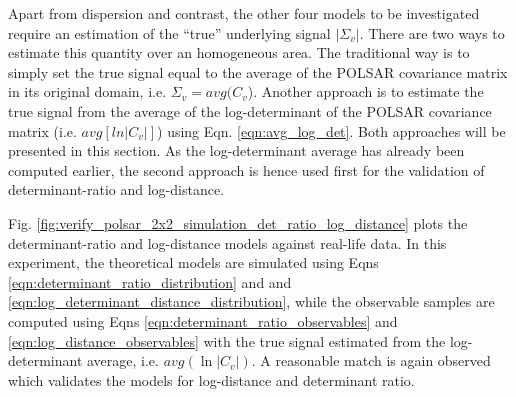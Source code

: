 \documentclass[journal]{IEEEtran}
\begin{document}
Apart from dispersion and contrast,
the other four models to be investigated require an estimation of the ``true'' underlying signal $|\Sigma_v|$. 
There are two ways to estimate this quantity over an homogeneous area.
The traditional way is to simply set the true signal equal to the average of the POLSAR covariance matrix in its original domain, i.e. $\Sigma_v = avg(C_v$).
Another approach is to estimate the true signal from the average of the log-determinant of the POLSAR covariance matrix (i.e. $avg[ln|C_v|]$) using Eqn. \ref{eqn:avg_log_det}.
Both approaches will be presented in this section.
As the log-determinant average has already been computed earlier, 
  the second approach is hence used first for the validation of determinant-ratio and log-distance.

Fig. \ref{fig:verify_polsar_2x2_simulation_det_ratio_log_distance} plots the determinant-ratio and log-distance models against real-life data.
In this experiment, the theoretical models are simulated using Eqns \ref{eqn:determinant_ratio_distribution} and
and \ref{eqn:log_determinant_distance_distribution},
  while the observable samples are computed using Eqns \ref{eqn:determinant_ratio_observables} and \ref{eqn:log_distance_observables}
  with the true signal estimated from the log-determinant average, i.e. $avg(\ln|C_v|)$.
A reasonable match is again observed which validates the models for log-distance and determinant ratio.   
\end{document}
